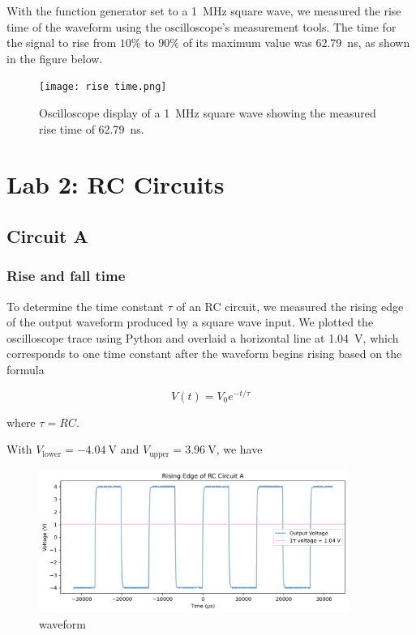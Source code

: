 \documentclass{article}
\begin{document}
With the function generator set to a \SI{1}{\mega\hertz} square wave, we measured the rise time of the waveform using the oscilloscope's measurement tools. The time for the signal to rise from $10\%$ to $90\%$ of its maximum value was \SI{62.79}{\nano\second}, as shown in the figure below.

\begin{figure}[H]
    \centering
    \texttt{[image: rise time.png]}
    \caption{Oscilloscope display of a \SI{1}{\mega\hertz} square wave showing the measured rise time of \SI{62.79}{\nano\second}.}
    \label{fig:rise_time}
\end{figure}


\section{Lab 2: RC Circuits}

\subsection{Circuit A}

\subsubsection{Rise and fall time}

To determine the time constant $\tau$ of an RC circuit, we measured the rising edge of the output waveform produced by a square wave input. We plotted the oscilloscope trace using Python and overlaid a horizontal line at \SI{1.04}{\volt}, which corresponds to one time constant after the waveform begins rising based on the formula

\begin{equation}
    V(t)=V_0 e^{-t/\tau}
\end{equation}

\noindent where $\tau=RC$.

With $V_\text{lower}=\SI{-4.04}{\volt}$ and $V_\text{upper}=\SI{3.96}{\volt}$, we have


\begin{figure}[H]
    \centering
    \includegraphics[width=0.9\textwidth]{2-1a.png}
    \caption{waveform}
    \label{fig:rise and fall time}
\end{figure}
\end{document}
